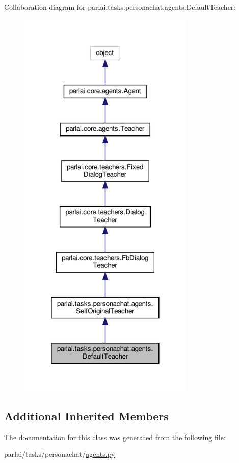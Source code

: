 Collaboration diagram for parlai.\+tasks.\+personachat.\+agents.\+Default\+Teacher\+:
\nopagebreak
\begin{figure}[H]
\begin{center}
\leavevmode
\includegraphics[width=238pt]{classparlai_1_1tasks_1_1personachat_1_1agents_1_1DefaultTeacher__coll__graph}
\end{center}
\end{figure}
\subsection*{Additional Inherited Members}


The documentation for this class was generated from the following file\+:\begin{DoxyCompactItemize}
\item 
parlai/tasks/personachat/\hyperlink{parlai_2tasks_2personachat_2agents_8py}{agents.\+py}\end{DoxyCompactItemize}
